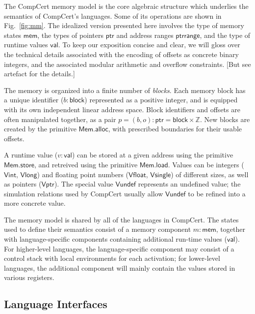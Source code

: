 \documentclass[acmsmall,timestamp,review,anonymous]{acmart}
\newcommand{\kw}[1]{\ensuremath{ \mathsf{#1} }}
\begin{document}
The CompCert memory model \cite{compcertmmv2}
is the core algebraic structure
which underlies the semantics of CompCert's languages.
Some of its operations
are shown in Fig.~\ref{fig:mm}.
The idealized version presented here
involves
the type of memory states \kw{mem},
the types of pointers \kw{ptr} and address ranges \kw{ptrrange}, and
the type of runtime values \kw{val}.
To keep our exposition concise and clear,
we will gloss over the technical details
associated with the encoding of offsets
as concrete binary integers,
and the associated modular arithmetic and overflow constraints.
[But see artefact for the details.]

The memory is organized into a finite number of \emph{blocks}.
Each memory block has a unique identifier ($b : \kw{block}$)
represented as a positive integer,
and is equipped with its own independent linear address space.
Block identifiers and offsets are often manipulated together,
as a pair $p = (b, o) : \kw{ptr} = \kw{block} \times \mathbb{Z}$.
New blocks are created by the primitive $\kw{Mem.alloc}$,
with prescribed boundaries for their usable offsets.

A runtime value ($v : \kw{val}$) can be stored at
a given address using the primitive \kw{Mem.store},
and retreived using the primitive \kw{Mem.load}.
Values can be integers (\kw{Vint}, \kw{Vlong}) and
floating point numbers (\kw{Vfloat}, \kw{Vsingle})
of different sizes,
as well as pointers (\kw{Vptr}).
The special value \kw{Vundef}
represents an undefined value;
the simulation relations used by CompCert
usually allow $\kw{Vundef}$
to be refined into a more concrete value.

The memory model is shared by all of the languages in CompCert.
The states used to define their semantics consist of
a memory component $m : \kw{mem}$,
together with language-specific components
containing additional run-time values ($\kw{val}$).
For higher-level languages,
the language-specific component may consist of
a control stack with local environments for each activation;
for lower-level languages,
the additional component will mainly contain
the values stored in various registers.


\subsection{Language Interfaces} \label{sec:compcert:li} %
\end{document}
